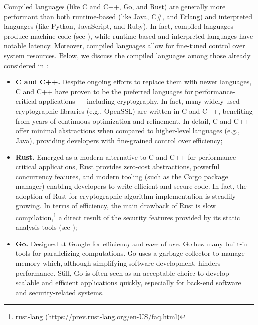 Compiled languages (like C and C++, Go, and Rust) are generally more performant than both runtime-based (like Java, C\#, and Erlang) and interpreted languages (like Python, JavaScript, and Ruby). In fact, compiled languages produce machine code (see ), while runtime-based and interpreted languages have notable latency. Moreover, compiled languages allow for fine-tuned control over system resources. Below, we discuss the compiled languages among those already considered in :

\begin{itemize}
	
	\item \textbf{C and C++.} Despite ongoing efforts to replace them with newer languages, C and C++ have proven to be the preferred languages for performance-critical applications --- including cryptography. In fact, many widely used cryptographic libraries (e.g., OpenSSL) are written in C and C++, benefiting from years of continuous optimization and refinement. In detail, C and C++ offer minimal abstractions when compared to higher-level languages (e.g., Java), providing developers with fine-grained control over efficiency;
	
	\item \textbf{Rust.} Emerged as a modern alternative to C and C++ for performance-critical applications, Rust provides zero-cost abstractions, powerful concurrency features, and modern tooling (such as the Cargo package manager) enabling developers to write efficient and secure code. In fact, the adoption of Rust for cryptographic algorithm implementation is steadily growing. In terms of efficiency, the main drawback of Rust is slow compilation,\footnote{rust-lang (\url{https://prev.rust-lang.org/en-US/faq.html})} a direct result of the security features provided by its static analysis tools (see );
	
	\item \textbf{Go.} Designed at Google for efficiency and ease of use. Go has many built-in tools for parallelizing computations. Go uses a garbage collector to manage memory which, although simplifying software development, hinders performance. Still, Go is often seen as an acceptable choice to develop scalable and efficient applications quickly, especially for back-end software and security-related systems.
	
\end{itemize}

